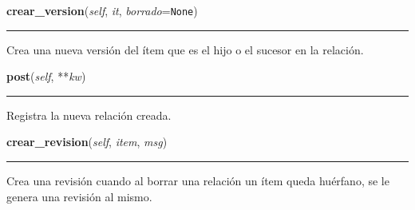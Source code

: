     \vspace{0.5ex}

\hspace{.8\funcindent}\begin{boxedminipage}{\funcwidth}

    \raggedright \textbf{crear\_version}(\textit{self}, \textit{it}, \textit{borrado}={\tt None})

    \vspace{-1.5ex}

    \rule{\textwidth}{0.5\fboxrule}
\setlength{\parskip}{2ex}
    Crea una nueva versión del ítem que es el hijo o el sucesor en la 
    relación.

\setlength{\parskip}{1ex}
    \end{boxedminipage}

    \label{saip:controllers:relacion_controller:RelacionController:post}

    \vspace{0.5ex}

\hspace{.8\funcindent}\begin{boxedminipage}{\funcwidth}

    \raggedright \textbf{post}(\textit{self}, **\textit{kw})

    \vspace{-1.5ex}

    \rule{\textwidth}{0.5\fboxrule}
\setlength{\parskip}{2ex}
    Registra la nueva relación creada.

\setlength{\parskip}{1ex}
    \end{boxedminipage}

    \label{saip:controllers:relacion_controller:RelacionController:crear_revision}

    \vspace{0.5ex}

\hspace{.8\funcindent}\begin{boxedminipage}{\funcwidth}

    \raggedright \textbf{crear\_revision}(\textit{self}, \textit{item}, \textit{msg})

    \vspace{-1.5ex}

    \rule{\textwidth}{0.5\fboxrule}
\setlength{\parskip}{2ex}
    Crea una revisión cuando al borrar una relación un ítem queda huérfano,
    se le genera una revisión al mismo.

\setlength{\parskip}{1ex}
    \end{boxedminipage}

